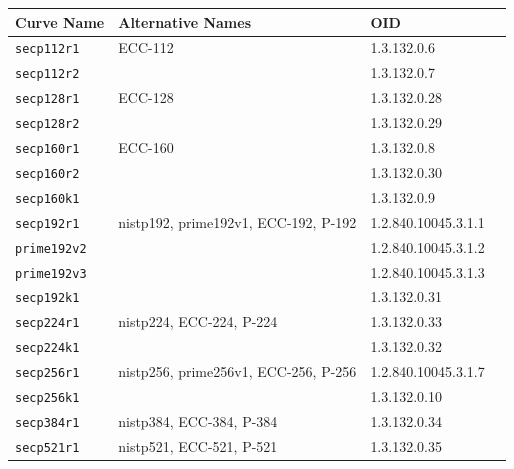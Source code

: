 \documentclass[synpaper]{book}
\begin{document}
\begin{table}[H]
\begin{center}
\begin{tabular}{|l|l|l|l|}
\hline \textbf{Curve Name}      & \textbf{Alternative Names}           & \textbf{OID}          \\
\hline \texttt{secp112r1}       & ECC-112                              & 1.3.132.0.6           \\
\hline \texttt{secp112r2}       &                                      & 1.3.132.0.7           \\
\hline \texttt{secp128r1}       & ECC-128                              & 1.3.132.0.28          \\
\hline \texttt{secp128r2}       &                                      & 1.3.132.0.29          \\
\hline \texttt{secp160r1}       & ECC-160                              & 1.3.132.0.8           \\
\hline \texttt{secp160r2}       &                                      & 1.3.132.0.30          \\
\hline \texttt{secp160k1}       &                                      & 1.3.132.0.9           \\
\hline \texttt{secp192r1}       & nistp192, prime192v1, ECC-192, P-192 & 1.2.840.10045.3.1.1   \\
\hline \texttt{prime192v2}      &                                      & 1.2.840.10045.3.1.2   \\
\hline \texttt{prime192v3}      &                                      & 1.2.840.10045.3.1.3   \\
\hline \texttt{secp192k1}       &                                      & 1.3.132.0.31          \\
\hline \texttt{secp224r1}       & nistp224, ECC-224, P-224             & 1.3.132.0.33          \\
\hline \texttt{secp224k1}       &                                      & 1.3.132.0.32          \\
\hline \texttt{secp256r1}       & nistp256, prime256v1, ECC-256, P-256 & 1.2.840.10045.3.1.7   \\
\hline \texttt{secp256k1}       &                                      & 1.3.132.0.10          \\
\hline \texttt{secp384r1}       & nistp384, ECC-384, P-384             & 1.3.132.0.34          \\
\hline \texttt{secp521r1}       & nistp521, ECC-521, P-521             & 1.3.132.0.35          \\

\end{tabular}
\end{center}
\end{table}
\end{document}
